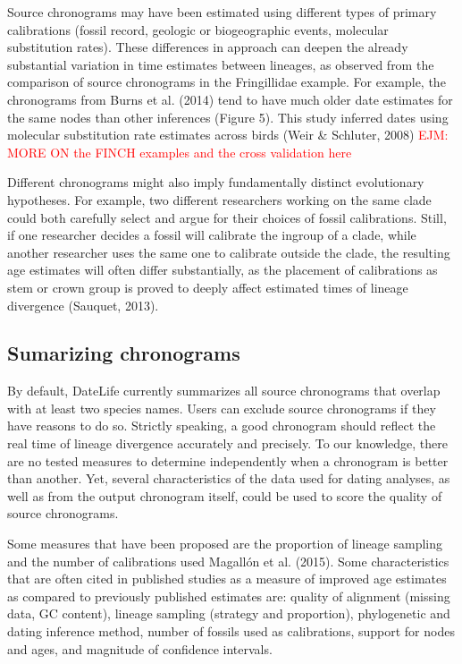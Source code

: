 \documentclass[
  english,
  man]{apa6}
\begin{document}
Source chronograms may have been estimated using different types of primary calibrations (fossil record, geologic or biogeographic events, molecular substitution rates).
These differences in approach can deepen the already substantial variation in time estimates between lineages, as observed from the comparison of source chronograms in the Fringillidae example.
For example, the chronograms from Burns et al. (2014) tend to have much older date estimates for the same nodes than other inferences (Figure 5). This study inferred dates using molecular substitution rate estimates across birds (Weir \& Schluter, 2008)
\textcolor{red}{EJM: MORE ON the FINCH examples and the cross validation here}

Different chronograms might also imply fundamentally distinct evolutionary hypotheses.
For example, two different researchers working on the same clade could both carefully select and argue for their choices of fossil calibrations.
Still, if one researcher decides a fossil will calibrate the ingroup of a clade, while another researcher uses the same one to calibrate outside the clade, the resulting age estimates will often differ substantially, as the placement of calibrations as stem or crown group is proved to deeply affect estimated times of lineage divergence (Sauquet, 2013).

\hypertarget{sumarizing-chronograms}{%
\subsection{Sumarizing chronograms}\label{sumarizing-chronograms}}

By default, DateLife currently summarizes all source chronograms that overlap with at least two species names. Users can exclude source chronograms if they have reasons to do so.
Strictly speaking, a good chronogram should reflect the real time of lineage divergence accurately and precisely.
To our knowledge, there are no tested measures to determine independently when a chronogram is better than another. Yet, several characteristics of the data used for dating analyses, as well as from the output chronogram itself, could be used to score the quality of source chronograms.

Some measures that have been proposed are the proportion of lineage sampling and the number of calibrations used Magallón et al. (2015).
Some characteristics that are often cited in published studies as a measure of improved age estimates as compared to previously published estimates are: quality of alignment (missing data, GC content), lineage sampling (strategy and proportion), phylogenetic and dating inference method, number of fossils used as calibrations, support for nodes and ages, and magnitude of confidence intervals.
\end{document}
